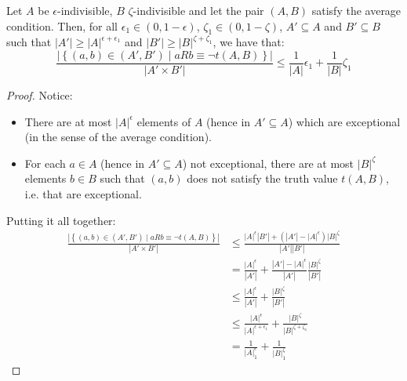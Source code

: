     \lemma[Claim 4.8]\label{exceptions_bound_of_epsilon_indivisible_sets}
        Let $A$ be $\epsilon$-indivisible, $B$ $\zeta$-indivisible and let the pair $(A,B)$ satisfy the average condition.
        Then, for all $\epsilon_1 \in \left( 0, 1-\epsilon \right)$, $\zeta_1 \in \left( 0, 1-\zeta \right)$, $A' \subseteq A$
            and $B' \subseteq B$ such that $|A'| \geq |A|^{\epsilon + \epsilon_1}$ and $|B'| \geq |B|^{\zeta + \zeta_1}$,
            we have that:
        \[
            \frac{|\left\{ (a,b) \in (A',B') \mid a R b \equiv \neg t(A,B) \right\}|}{|A' \times B'|} \leq
                \frac{1}{|A|}\epsilon_1 + \frac{1}{|B|}\zeta_1
        \]
        \begin{proof}
            Notice:
            \begin{itemize}
                \item There are at most $|A|^\epsilon$ elements of $A$ (hence in $A' \subseteq A$) which are exceptional
                    (in the sense of the average condition).
                \item For each $a \in A$ (hence in $A' \subseteq A$) not exceptional, there are at most $|B|^\zeta$ elements
                    $b \in B$ such that $(a,b)$ does not satisfy the truth value $t(A,B)$, i.e. that are exceptional.
            \end{itemize}
            Putting it all together:
            \[
                \begin{split}
                    \frac{|\left\{ (a,b) \in (A',B') \mid a R b \equiv \neg t(A,B) \right\}|}{|A' \times B'|}
                        &\leq \frac{|A|^\epsilon |B'| + (|A'| - |A|^\epsilon) |B|^\zeta}{|A'| |B'|} \\
                        &= \frac{|A|^\epsilon}{|A'|} + \frac{|A'| - |A|^\epsilon}{|A'|} \frac{|B|^\zeta}{|B'|} \\
                        &\leq \frac{|A|^\epsilon}{|A'|} + \frac{|B|^\zeta}{|B'|} \\
                        &\leq \frac{|A|^\epsilon}{|A|^{\epsilon + \epsilon_1}} + \frac{|B|^\zeta}{|B|^{\zeta + \zeta_1}} \\
                        &= \frac{1}{|A|^\epsilon_1} + \frac{1}{|B|^\zeta_1}
                \end{split}
            \]
        \end{proof}

